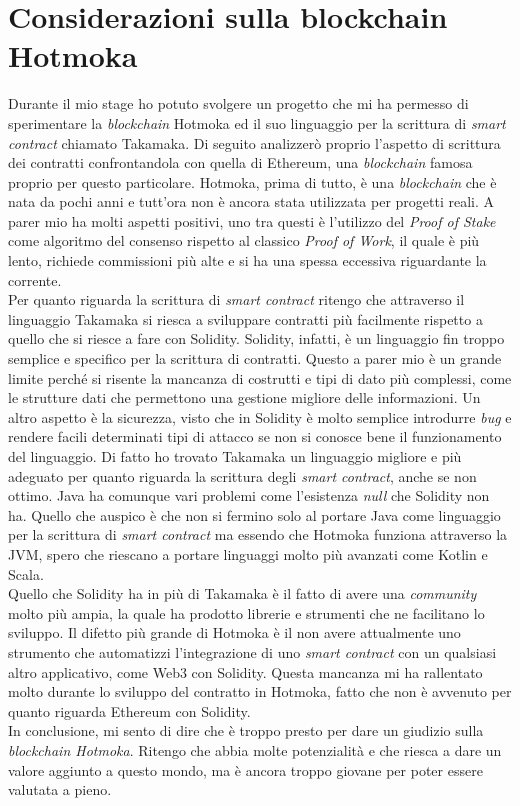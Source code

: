
\section{Considerazioni sulla blockchain Hotmoka}
Durante il mio stage ho potuto svolgere un progetto che mi ha permesso di sperimentare la \textit{blockchain} Hotmoka ed il suo linguaggio per la scrittura di \textit{smart contract} chiamato Takamaka. Di seguito analizzerò proprio l'aspetto di scrittura dei contratti confrontandola con quella di Ethereum, una \textit{blockchain} famosa proprio per questo particolare. 
Hotmoka, prima di tutto, è una \textit{blockchain} che è nata da pochi anni e tutt'ora non è ancora stata utilizzata per progetti reali. A parer mio ha molti aspetti positivi, uno tra questi è l'utilizzo del \textit{Proof of Stake} come algoritmo del consenso rispetto al classico \textit{Proof of Work}, il quale è più lento, richiede commissioni più alte e si ha una spessa eccessiva riguardante la corrente. \\

Per quanto riguarda la scrittura di \textit{smart contract} ritengo che attraverso il linguaggio Takamaka si riesca a sviluppare contratti più facilmente rispetto a quello che si riesce a fare con Solidity. Solidity, infatti, è un linguaggio fin troppo semplice e specifico per la scrittura di contratti. Questo a parer mio è un grande limite perché si risente la mancanza di costrutti e tipi di dato più complessi, come le strutture dati che permettono una gestione migliore delle informazioni. Un altro aspetto è la sicurezza, visto che in Solidity è molto semplice introdurre \textit{bug} e rendere facili determinati tipi di attacco se non si conosce bene il funzionamento del linguaggio.
Di fatto ho trovato Takamaka un linguaggio migliore e più adeguato per quanto riguarda la scrittura degli \textit{smart contract}, anche se non ottimo. Java ha comunque vari problemi come l'esistenza \textit{null} che Solidity non ha. Quello che auspico è che non si fermino solo al portare Java come linguaggio per la scrittura di \textit{smart contract} ma essendo che Hotmoka funziona attraverso la JVM, spero che riescano a portare linguaggi molto più avanzati come Kotlin e Scala. \\

Quello che Solidity ha in più di Takamaka è il fatto di avere una \textit{community} molto più ampia, la quale ha prodotto librerie e strumenti che ne facilitano lo sviluppo. Il difetto più grande di Hotmoka è il non avere attualmente uno strumento che automatizzi l'integrazione di uno \textit{smart contract} con un qualsiasi altro applicativo, come Web3 con Solidity. Questa mancanza mi ha rallentato molto durante lo sviluppo del contratto in Hotmoka, fatto che non è avvenuto per quanto riguarda Ethereum con Solidity. \\

In conclusione, mi sento di dire che è troppo presto per dare un giudizio sulla \textit{blockchain Hotmoka}. Ritengo che abbia molte potenzialità e che riesca a dare un valore aggiunto a questo mondo, ma è ancora troppo giovane per poter essere valutata a pieno. 
